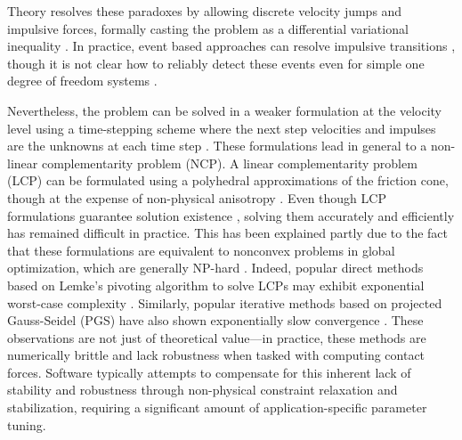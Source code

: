 %
Theory resolves these paradoxes by allowing discrete velocity jumps and
impulsive forces, formally casting the problem as a differential variational
inequality \cite{bib:pang2008differential}. In practice, event based approaches
can resolve impulsive transitions \cite{bib:haug1986}, though it is not clear
how to reliably detect these events even for simple one degree of freedom
systems \cite{bib:hogan2017regularization}.

Nevertheless, the problem can be solved in a weaker formulation at the velocity
level using a time-stepping scheme where the next step velocities and impulses
are the unknowns at each time step \cite{bib:stewart1996implicit,
bib:anitescu1997}. These formulations lead in general to a non-linear
complementarity problem (NCP). A linear complementarity problem (LCP) can be
formulated using a polyhedral approximations of the friction cone, though at the
expense of non-physical anisotropy \cite{bib:li2018implicit}. Even though LCP
formulations guarantee solution existence \cite{bib:anitescu1997,
bib:stewart1998convergence}, solving them accurately and efficiently has
remained difficult in practice. This has been explained partly due to the fact
that these formulations are equivalent to nonconvex problems in global
optimization, which are generally NP-hard \cite{bib:Kaufman2008}. Indeed,
popular direct methods based on Lemke's pivoting algorithm to solve LCPs may
exhibit exponential worst-case complexity \cite{bib:baraff1994fast}. Similarly,
popular iterative methods based on projected Gauss-Seidel (PGS)
\cite{bib:duriez2006_realistic_haptic_rendering, bib:bullet} have also shown
exponentially slow convergence \cite{bib:erleben2007velocity}. These
observations are not just of theoretical value---in practice, these methods are
numerically brittle and lack robustness when tasked with computing contact
forces. Software typically attempts to compensate for this inherent lack of
stability and robustness through non-physical constraint relaxation and
stabilization, requiring a significant amount of application-specific parameter
tuning.

